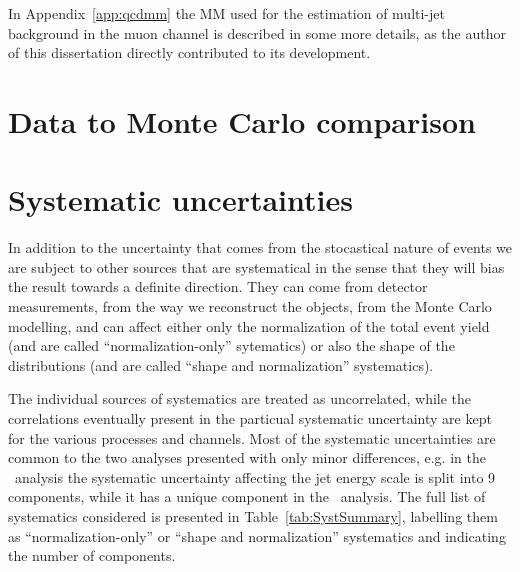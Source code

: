 In Appendix~\ref{app:qcdmm} the MM used for the estimation
of multi-jet background in the muon channel is
described in some more details, as the author of this dissertation
directly contributed to its development.


\section{Data to Monte Carlo comparison}\label{sec:datamcpresel}




\section{Systematic uncertainties}\label{sec:systematics}

In addition to the uncertainty that comes from the stocastical nature
of events we are subject to other sources that are systematical in the sense
that they will bias the result towards a definite direction. They can come from
detector measurements, from the way we reconstruct the objects, from the Monte
Carlo modelling, and can affect either only the normalization of the total event
yield (and are called ``normalization-only'' sytematics) or also the shape 
of the distributions (and are called ``shape and normalization'' systematics).

The individual sources of systematics are treated as uncorrelated, while
the correlations eventually present in the particual systematic uncertainty are 
kept for the various processes and channels. Most of the systematic uncertainties
are common to the two analyses presented with only minor differences, e.g. in the
\htx\  analysis the systematic uncertainty affecting the jet energy scale is
split into 9 components, while it has a unique component in the \wbx\  analysis. 
The full list of systematics considered is presented in 
Table~\ref{tab:SystSummary}, labelling them as  ``normalization-only'' 
or ``shape and normalization'' systematics and indicating the number of components.

